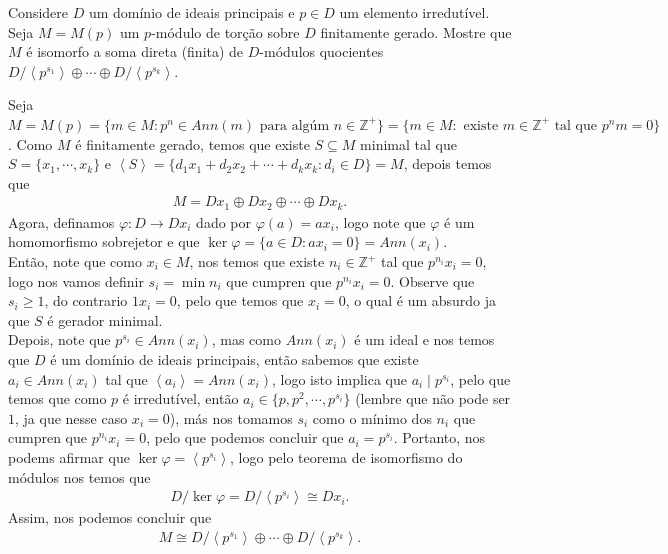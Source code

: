 \begin{homeworkProblem}
  Considere $D$ um domínio de ideais principais e $p\in D$ um elemento irredutível. Seja $M=M(p)$ um $p$-módulo de torção sobre $D$ finitamente gerado. Mostre que $M$ é isomorfo a soma direta (finita) de $D$-módulos quocientes $D/\left\langle p^{s_1} \right\rangle\oplus\cdots\oplus D/\left\langle p^{s_k} \right\rangle$.
  \begin{solution}
    Seja $M=M(p)=\{m\in M:p^{n}\in Ann(m)\text{ para algúm }n\in\mathbb{Z}^{+}\}=\{m\in M:\text{ existe }m\in\mathbb{Z}^{+}\text{ tal que }p^{n}m=0\}$. Como $M$ é finitamente gerado, temos que existe $S\subseteq M$ minimal tal que $S=\{x_1,\cdots,x_k\}$ e $\left\langle S \right\rangle=\{d_1x_1+d_2x_2+\cdots+d_kx_k: d_i\in D\}=M$, depois temos que 
    \begin{align*}
      M=Dx_1\oplus Dx_2\oplus\cdots\oplus Dx_k.
    \end{align*}
    Agora, definamos $\varphi:D\to Dx_i$ dado por $\varphi(a)=ax_i$, logo note que $\varphi$ é um homomorfismo sobrejetor e que $\ker\varphi=\{a\in D:ax_i=0\}=Ann(x_i)$.\\
    Então, note que como $x_i\in M$, nos temos que existe $n_i\in\mathbb{Z}^{+}$ tal que $p^{n_i}x_i=0$, logo nos vamos definir $s_i=\min n_i$ que cumpren que $p^{n_i}x_i=0$. Observe que $s_i\geq 1$, do contrario $1x_i=0$, pelo que temos que $x_i=0$, o qual é um absurdo ja que $S$ é gerador minimal.\\
    Depois, note que $p^{s_i}\in Ann(x_i)$, mas como $Ann(x_i)$ é um ideal e nos temos que $D$ é um domínio de ideais principais, então sabemos que existe $a_i\in Ann(x_i)$ tal que $\left\langle a_i \right\rangle=Ann(x_i)$, logo isto implica que $a_i\mid p^{s_i}$, pelo que temos que como $p$ é irredutível, então $a_i\in\{p,p^{2},\cdots,p^{s_i}\}$ (lembre que não pode ser $1$, ja que nesse caso $x_i=0$), más nos tomamos $s_i$ como o mínimo dos $n_i$ que cumpren que $p^{n_i}x_i=0$, pelo que podemos concluir que $a_i=p^{s_i}$. Portanto, nos podems afirmar que $\ker\varphi=\left\langle p^{s_i} \right\rangle$, logo pelo teorema de isomorfismo do módulos nos temos que
    \begin{align*}
      D/\ker\varphi=D/\left\langle p^{s_i} \right\rangle\cong Dx_i.
    \end{align*}
    Assim, nos podemos concluir que
    \begin{align*}
      M\cong D/\left\langle p^{s_1} \right\rangle\oplus\cdots\oplus D/\left\langle p^{s_k} \right\rangle.
    \end{align*}
  \end{solution}
\end{homeworkProblem}
